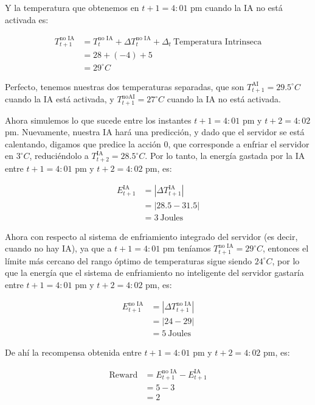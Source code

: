 \documentclass[]{book}
\begin{document}
Y la temperatura que obtenemos en \(t + 1 = 4: 01\) pm cuando la IA no está activada es:

\begin{align*}
    T_{t+1}^{\textrm{no IA}}
    & = T_t^{\textrm{no IA}} + \Delta T_t^{\textrm{no IA}} + \Delta_t \ \textrm{Temperatura Intrinseca} \\
    & = 28 + (-4) + 5 \\
    & = 29^{\circ} C
\end{align*}

Perfecto, tenemos nuestras dos temperaturas separadas, que son \(T_{t+1}^{\textrm{AI}} = 29.5^{\circ} C\) cuando la IA está activada, y \(T_{t+1}^{\textrm{noAI}} = 27^{\circ} C\) cuando la IA no está activada.

Ahora simulemos lo que sucede entre los instantes \(t + 1 = 4:01\) pm y \(t + 2 = 4:02\) pm. Nuevamente, nuestra IA hará una predicción, y dado que el servidor se está calentando, digamos que predice la acción 0, que corresponde a enfriar el servidor en \(3^{\circ} C\), reduciéndolo a \(T_{t + 2}^{\textrm{IA}} = 28.5^{\circ} C\). Por lo tanto, la energía gastada por la IA entre \(t + 1 = 4: 01\) pm y \(t + 2 = 4: 02\) pm, es:

\begin{align*}
    E_{t+1}^{\textrm{IA}}
    & = |\Delta T_{t+1}^{\textrm{IA}}| \\
    & = |28.5 - 31.5| \\
    & = 3 \ \textrm{Joules}
\end{align*}

Ahora con respecto al sistema de enfriamiento integrado del servidor (es decir, cuando no hay IA), ya que a \(t + 1 = 4: 01\) pm teníamos \(T_{t + 1}^{\textrm{no IA}} = 29^{\circ} C\), entonces el límite más cercano del rango óptimo de temperaturas sigue siendo \(24^{\circ} C\), por lo que la energía que el sistema de enfriamiento no inteligente del servidor gastaría entre \(t + 1 = 4: 01\) pm y \(t + 2 = 4 : 02\) pm, es:

\begin{align*}
    E_{t+1}^{\textrm{no IA}}
    & = |\Delta T_{t+1}^{\textrm{no IA}}| \\
    & = |24 - 29| \\
    & = 5 \ \textrm{Joules}
\end{align*}

De ahí la recompensa obtenida entre \(t+1 = 4:01\) pm y \(t+2 = 4:02\) pm, es:

\begin{align*}
    \textrm{Reward}
    & = E_{t+1}^{\textrm{no IA}} - E_{t+1}^{\textrm{IA}} \\
    & = 5 - 3 \\
    & = 2
\end{align*}
\end{document}
